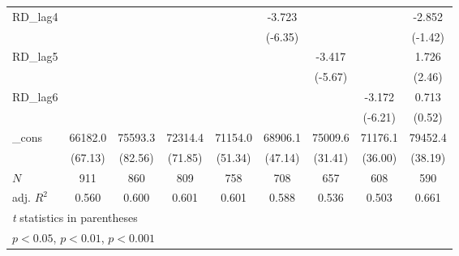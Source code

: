 {\begin{tabular}{l*{8}{c}}
\addlinespace
RD\_lag4     &                     &                     &                     &                     &      -3.723\sym{***}&                     &                     &      -2.852         \\
            &                     &                     &                     &                     &     (-6.35)         &                     &                     &     (-1.42)         \\
\addlinespace
RD\_lag5     &                     &                     &                     &                     &                     &      -3.417\sym{***}&                     &       1.726\sym{*}  \\
            &                     &                     &                     &                     &                     &     (-5.67)         &                     &      (2.46)         \\
\addlinespace
RD\_lag6     &                     &                     &                     &                     &                     &                     &      -3.172\sym{***}&       0.713         \\
            &                     &                     &                     &                     &                     &                     &     (-6.21)         &      (0.52)         \\
\addlinespace
\_cons      &     66182.0\sym{***}&     75593.3\sym{***}&     72314.4\sym{***}&     71154.0\sym{***}&     68906.1\sym{***}&     75009.6\sym{***}&     71176.1\sym{***}&     79452.4\sym{***}\\
            &     (67.13)         &     (82.56)         &     (71.85)         &     (51.34)         &     (47.14)         &     (31.41)         &     (36.00)         &     (38.19)         \\
\midrule
\(N\)       &         911         &         860         &         809         &         758         &         708         &         657         &         608         &         590         \\
adj. \(R^{2}\)&       0.560         &       0.600         &       0.601         &       0.601         &       0.588         &       0.536         &       0.503         &       0.661         \\
\bottomrule
\multicolumn{9}{l}{\footnotesize \textit{t} statistics in parentheses}\\
\multicolumn{9}{l}{\footnotesize \sym{*} \(p<0.05\), \sym{**} \(p<0.01\), \sym{***} \(p<0.001\)}\\
\end{tabular}
}
